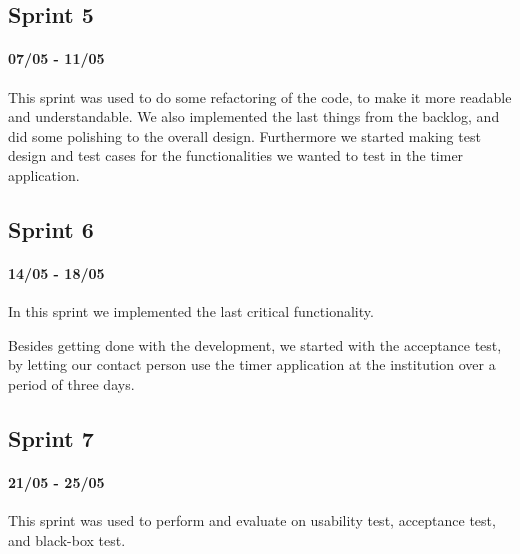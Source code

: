 \subsection*{Sprint 5}
\paragraph{07/05 - 11/05}
This sprint was used to do some refactoring of the code, to make it more readable and understandable. We also implemented the last things from the backlog, and did some polishing to the overall design. Furthermore we started making test design and test cases for the functionalities we wanted to test in the timer application.

\subsection*{Sprint 6}
\paragraph{14/05 - 18/05}
In this sprint we implemented the last critical functionality.

Besides getting done with the development, we started with the acceptance test, by letting our contact person use the timer application at the institution over a period of three days.
	
\subsection*{Sprint 7}
\paragraph{21/05 - 25/05}
This sprint was used to perform and evaluate on usability test, acceptance test, and black-box test.